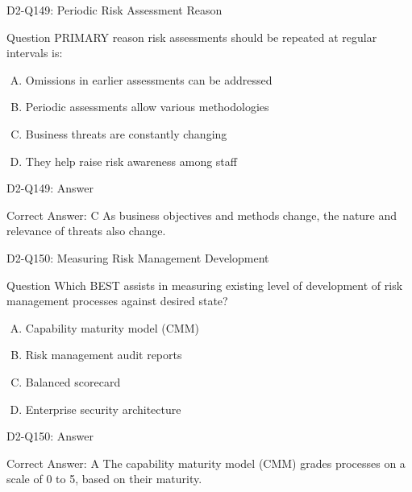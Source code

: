 \documentclass{beamer}
\begin{document}
	\begin{frame}{D2-Q149: Periodic Risk Assessment Reason}
		\begin{block}{Question}
			PRIMARY reason risk assessments should be repeated at regular intervals is:
		\end{block}
		\begin{enumerate}[(A)]
			\item Omissions in earlier assessments can be addressed
			\item Periodic assessments allow various methodologies
			\item Business threats are constantly changing
			\item They help raise risk awareness among staff
		\end{enumerate}
	\end{frame}
	\begin{frame}{D2-Q149: Answer}
		\begin{block}{Correct Answer: C}
			As business objectives and methods change, the nature and relevance of threats also change.
		\end{block}
	\end{frame}
	
	\begin{frame}{D2-Q150: Measuring Risk Management Development}
		\begin{block}{Question}
			Which BEST assists in measuring existing level of development of risk management processes against desired state?
		\end{block}
		\begin{enumerate}[(A)]
			\item Capability maturity model (CMM)
			\item Risk management audit reports
			\item Balanced scorecard
			\item Enterprise security architecture
		\end{enumerate}
	\end{frame}
	\begin{frame}{D2-Q150: Answer}
		\begin{block}{Correct Answer: A}
			The capability maturity model (CMM) grades processes on a scale of 0 to 5, based on their maturity.
		\end{block}
	\end{frame}
	
\end{document}
